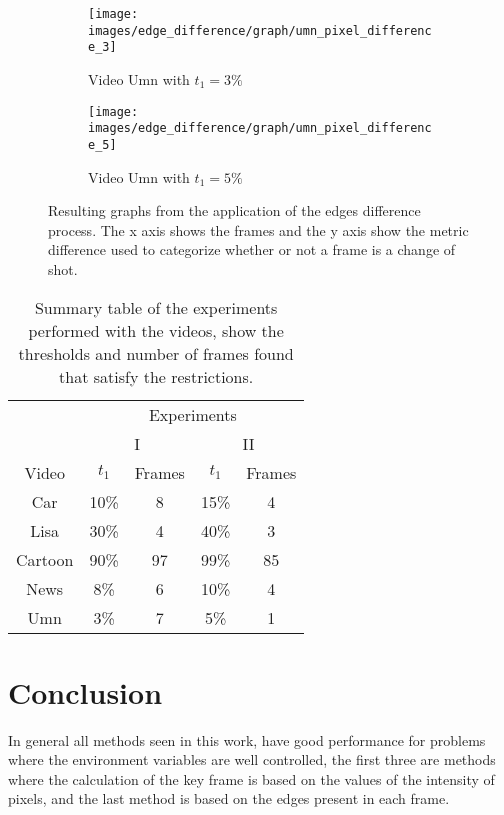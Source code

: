 \documentclass[journal]{IEEEtran}
\begin{document}
\begin{figure}
	\centering
	\begin{subfigure}{0.23\textwidth}
		\centering
		\texttt{[image: images/edge\_difference/graph/umn\_pixel\_difference\_3]} 
		\caption{Video Umn with $t_1 = 3\%$}
		\label{fig:edge_difference:graph:umn_3} 
	\end{subfigure}
	\centering
	\begin{subfigure}{0.23\textwidth}
		\centering
		\texttt{[image: images/edge\_difference/graph/umn\_pixel\_difference\_5]} 
		\caption{Video Umn with $t_1 = 5\%$}
		\label{fig:edge_difference:graph:umn_5} 
	\end{subfigure}

\caption{Resulting graphs from the application of the edges difference process. The x axis shows the frames and the y axis show the metric difference used to categorize whether or not a frame is a change of shot.}
\label{fig:edge_difference:graph}
\end{figure}





\begin{table}
	\centering
	\begin{tabular}{ | c | c | c | c | c |}
		\hline
		& \multicolumn{4}{|c|}{Experiments} \\ 
		\cline{2-5}
		& \multicolumn{2}{|c|}{I} &  \multicolumn{2}{|c|}{II} \\
		\hline
		Video  & $t_1$ & Frames & $t_1$ & Frames   \\
		\hline
		Car & 10\% & 8 & 15\% & 4  \\
		Lisa & 30\% & 4 & 40\% & 3  \\
		Cartoon & 90\% & 97 & 99\% & 85 \\
		News & 8\% & 6 & 10\% & 4 \\
		Umn & 3\% & 7 & 5\% & 1 \\
		\hline
	\end{tabular}
	\caption{Summary table of the experiments performed with the videos, show the thresholds and number of frames found that satisfy the restrictions.}
	\label{tab:table:edge_difference}
\end{table}

\section{Conclusion}
In general all methods seen in this work, have good performance for problems where the environment variables are well controlled, the first three are methods where the calculation of the key frame is based on the values of the intensity of pixels, and the last method is based on the edges present in each frame.
\end{document}
